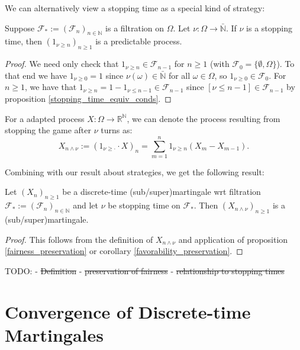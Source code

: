 We can alternatively view a stopping time as a special kind of strategy:

\begin{proposition}
    Suppose $\mathcal{F}_{*} := (\mathcal{F}_{n})_{n \in \mathbb{N}}$ is a filtration on $\Omega$. Let $\nu : \Omega \to \bar{\mathbb{N}}$. If \(\nu\) is a stopping time, then \((1_{\nu \geq n})_{n \geq 1}\) is a predictable process.
\end{proposition}

\begin{proof}
    We need only check that \(1_{\nu \geq n} \in \mathcal{F}_{n-1}\) for \(n \geq 1\) (with \(\mathcal{F}_{0} = \{\emptyset, \Omega\}\)). To that end we have \(1_{\nu \geq 0} = 1\) since \(\nu(\omega) \in \bar{\mathbb{N}}\) for all \(\omega \in \Omega\), so \(1_{\nu \geq 0} \in \mathcal{F}_{0}\). For \(n \geq 1\), we have that \(1_{\nu \geq n} = 1 - 1_{\nu \leq n-1} \in \mathcal{F}_{n-1}\) since \([\nu \leq n-1] \in \mathcal{F}_{n-1}\) by proposition \ref{stopping_time_equiv_conds}.
\end{proof}

For a adapted process $X: \Omega \to \mathbb{R}^{\mathbb{N}}$, we can denote the process resulting from stopping the game after \(\nu\) turns as:
\[X_{n \wedge \nu} := (1_{\nu \geq \cdot} \cdot X)_{n} = \sum\limits_{m=1}^{n} 1_{\nu \geq n} (X_{m} - X_{m-1}).\]

Combining with our result about strategies, we get the following result:

\begin{corollary}
    Let $(X_{n})_{n \geq 1}$ be a discrete-time (sub/super)martingale wrt filtration $\mathcal{F}_{*} := (\mathcal{F}_{n})_{n \in \mathbb{N}}$ and let \(\nu\) be stopping time on \(\mathcal{F}_{*}\). Then \((X_{n \wedge \nu})_{n \geq 1}\) is a (sub/super)martingale.
\end{corollary}

\begin{proof}
    This follows from the definition of \(X_{n \wedge \nu}\) and application of proposition \ref{fairness_preservation} or corollary \ref{favorability_preservation}.
\end{proof}

TODO:
- \st{Definition}
- \st{preservation of fairness}
- \st{relationship to stopping times}

\section{Convergence of Discrete-time Martingales}

